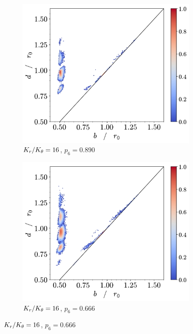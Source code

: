 \begin{figure}[tbp]
	\centering
     
      \begin{subfigure}[b]{0.40\textwidth}
         \centering
         \includegraphics[width=\textwidth]{./figures/ph/t_k16_399_bs_pd.pdf}
         \caption{$K_r/K_\theta=16$, $p_6=0.890$} %
         \label{fig:bspda}
     \end{subfigure}
     \hspace{1cm}
        \begin{subfigure}[b]{0.40\textwidth}
         \centering
         \includegraphics[width=\textwidth]{./figures/ph/t_k16_301_bs_pd.pdf}
         \caption{$K_r/K_\theta=16$, $p_6=0.666$}%
         \label{fig:bspdb}
     \end{subfigure}
     

\end{figure}
